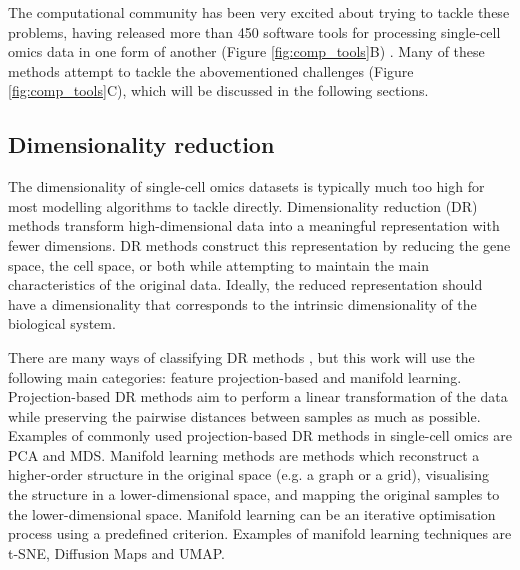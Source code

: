 The computational community has been very excited about trying to tackle these problems, having released more than 450 software tools for processing single-cell omics data in one form of another (Figure \ref{fig:comp_tools}B) \cite{zappia_exploringsinglecellrnaseq_2018}. Many of these methods attempt to tackle the abovementioned challenges (Figure \ref{fig:comp_tools}C), which will be discussed in the following sections.

\subsection{Dimensionality reduction}
The dimensionality of single-cell omics datasets is typically much too high for most modelling algorithms to tackle directly. Dimensionality reduction (DR) methods transform high-dimensional data into a meaningful representation with fewer dimensions. DR methods construct this representation by reducing the gene space, the cell space, or both while attempting to maintain the main characteristics of the original data.
Ideally, the reduced representation should have a dimensionality that corresponds to the intrinsic dimensionality of the biological system.

There are many ways of classifying DR methods \cite{engel_surveydimensionreduction_2012}, but this work will use the following main categories: feature projection-based and manifold learning. 
Projection-based DR methods aim to perform a linear transformation of the data while preserving the pairwise distances between samples as much as possible. Examples of commonly used projection-based DR methods in single-cell omics are PCA and MDS. 
Manifold learning methods are methods which reconstruct a higher-order structure in the original space (e.g. a graph or a grid), visualising the structure in a lower-dimensional space, and mapping the original samples to the lower-dimensional space. Manifold learning can be an iterative optimisation process using a predefined criterion. Examples of manifold learning techniques are t-SNE, Diffusion Maps and UMAP. 

